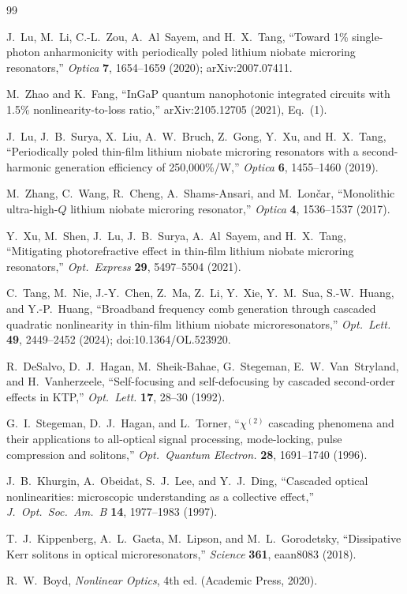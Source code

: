 \documentclass[11pt,a4paper]{article}
\begin{document}
\begin{thebibliography}{99}

J.~Lu, M.~Li, C.-L.~Zou, A.~Al~Sayem, and H.~X.~Tang,
``Toward 1\% single-photon anharmonicity with periodically poled lithium
niobate microring resonators,''
\emph{Optica} \textbf{7}, 1654--1659 (2020); arXiv:2007.07411.

M.~Zhao and K.~Fang,
``InGaP quantum nanophotonic integrated circuits with 1.5\% nonlinearity-to-loss
ratio,'' arXiv:2105.12705 (2021), Eq.~(1).

J.~Lu, J.~B.~Surya, X.~Liu, A.~W.~Bruch, Z.~Gong, Y.~Xu, and H.~X.~Tang,
``Periodically poled thin-film lithium niobate microring resonators with
a second-harmonic generation efficiency of 250,000\%/W,''
\emph{Optica} \textbf{6}, 1455--1460 (2019).

M.~Zhang, C.~Wang, R.~Cheng, A.~Shams-Ansari, and M.~Lon\v{c}ar,
``Monolithic ultra-high-$Q$ lithium niobate microring resonator,''
\emph{Optica} \textbf{4}, 1536--1537 (2017).

Y.~Xu, M.~Shen, J.~Lu, J.~B.~Surya, A.~Al~Sayem, and H.~X.~Tang,
``Mitigating photorefractive effect in thin-film lithium niobate
microring resonators,''
\emph{Opt.\ Express} \textbf{29}, 5497--5504 (2021).

C.~Tang, M.~Nie, J.-Y.~Chen, Z.~Ma, Z.~Li, Y.~Xie, Y.~M.~Sua,
S.-W.~Huang, and Y.-P.~Huang,
``Broadband frequency comb generation through cascaded quadratic
nonlinearity in thin-film lithium niobate microresonators,''
\emph{Opt.\ Lett.} \textbf{49}, 2449--2452 (2024);
doi:10.1364/OL.523920.

R.~DeSalvo, D.~J.~Hagan, M.~Sheik-Bahae, G.~Stegeman, E.~W.~Van~Stryland,
and H.~Vanherzeele,
``Self-focusing and self-defocusing by cascaded second-order effects in
KTP,''
\emph{Opt.\ Lett.} \textbf{17}, 28--30 (1992).

G.~I.~Stegeman, D.~J.~Hagan, and L.~Torner,
``$\chi^{(2)}$ cascading phenomena and their applications to all-optical
signal processing, mode-locking, pulse compression and solitons,''
\emph{Opt.\ Quantum Electron.} \textbf{28}, 1691--1740 (1996).

J.~B.~Khurgin, A.~Obeidat, S.~J.~Lee, and Y.~J.~Ding,
``Cascaded optical nonlinearities: microscopic understanding as a
collective effect,''
\emph{J.\ Opt.\ Soc.\ Am.\ B} \textbf{14}, 1977--1983 (1997).

T.~J.~Kippenberg, A.~L.~Gaeta, M.~Lipson, and M.~L.~Gorodetsky,
``Dissipative Kerr solitons in optical microresonators,''
\emph{Science} \textbf{361}, eaan8083 (2018).

R.~W.~Boyd, \emph{Nonlinear Optics}, 4th ed. (Academic Press, 2020).

\end{thebibliography}
\end{document}
